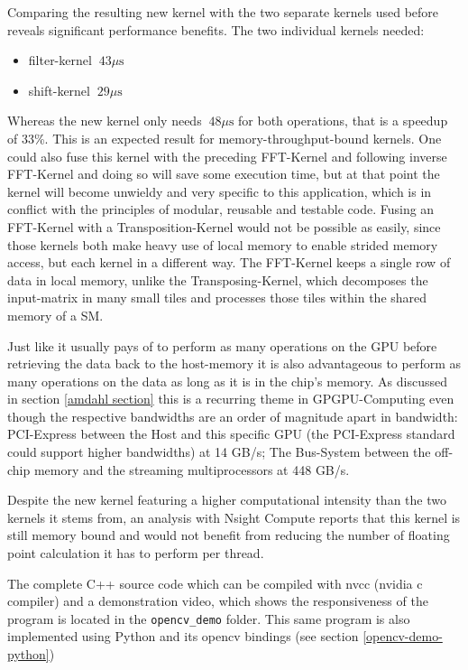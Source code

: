 \documentclass[english,11pt,a4paper,table]{article} %
\begin{document}
Comparing the resulting new kernel with the two separate kernels used before reveals significant performance benefits.
The two individual kernels needed:
\begin{itemize}
	\item filter-kernel $~43 \mu\text{s}$
	\item shift-kernel $~29 \mu\text{s}$
\end{itemize}
Whereas the new kernel only needs $~48 \mu\text{s}$ for both operations, that is a speedup of 33\%.
This is an expected result for memory-throughput-bound kernels.
One could also fuse this kernel with the preceding FFT-Kernel and following inverse FFT-Kernel and doing so will save some execution time, but at that point the kernel will become unwieldy and very specific to this application, which is in conflict with the principles of modular, reusable and testable code. Fusing an FFT-Kernel with a Transposition-Kernel would not be possible as easily, since those kernels both make heavy use of local memory to enable strided memory access, but each kernel in a different way.
The FFT-Kernel keeps a single row of data in local memory, unlike the Transposing-Kernel, which decomposes the input-matrix in many small tiles and processes those tiles within the shared memory of a SM.

Just like it usually pays of to perform as many operations on the GPU before retrieving the data back to the host-memory it is also advantageous to perform as many operations on the data as long as it is in the chip's memory.
As discussed in section \ref{amdahl section} this is a recurring theme in GPGPU-Computing even though the respective bandwidths are an order of magnitude apart in bandwidth: PCI-Express between the Host and this specific GPU (the PCI-Express standard could support higher bandwidths) at 14 GB/s; The Bus-System between the off-chip memory and the streaming multiprocessors at 448 GB/s.

Despite the new kernel featuring a higher computational intensity than the two kernels it stems from, an analysis with Nsight Compute reports that this kernel is still memory bound and would not benefit from reducing the number of floating point calculation it has to perform per thread.


The complete C++ source code which can be compiled with nvcc (nvidia c compiler) and a demonstration video, which shows the responsiveness of the program is located in the \texttt{opencv\_demo} folder.
This same program is also implemented using Python and its opencv bindings (see section \ref{opencv-demo-python})
\end{document}
